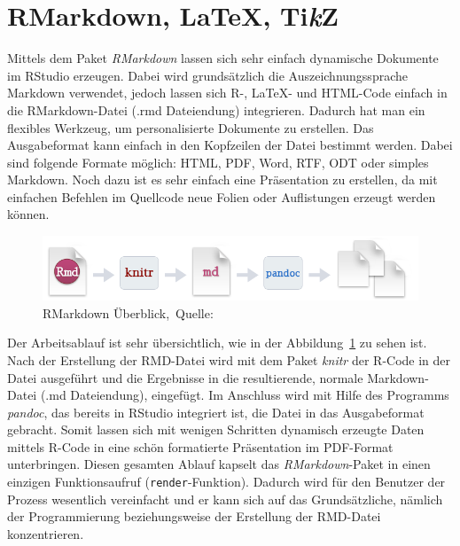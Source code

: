 \section{RMarkdown, \LaTeX, Ti\textit{k}Z}
\label{sec:RMarkdown}
Mittels dem Paket \emph{RMarkdown} lassen sich sehr einfach dynamische Dokumente im RStudio erzeugen. Dabei wird grundsätzlich die Auszeichnungssprache Markdown verwendet, jedoch lassen sich R-, \LaTeX - und HTML-Code einfach in die RMarkdown-Datei (.rmd Dateiendung) integrieren. Dadurch hat man ein flexibles Werkzeug, um personalisierte Dokumente zu erstellen. Das Ausgabeformat kann einfach in den Kopfzeilen der Datei bestimmt werden. Dabei sind folgende Formate möglich: HTML, PDF, Word, RTF, ODT oder simples Markdown. Noch dazu ist es sehr einfach eine Präsentation zu erstellen, da mit einfachen Befehlen im Quellcode neue Folien oder Auflistungen erzeugt werden können.

\begin{figure}[th]
\centering
\includegraphics[width=\ScaleIfNeeded]{pictures/RMarkdown}
\caption{RMarkdown Überblick,~Quelle:~\cite{rmarkdown}}
\label{pic:RMarkdown}
\end{figure}

Der Arbeitsablauf ist sehr übersichtlich, wie in der Abbildung~\ref{pic:RMarkdown} zu sehen ist. Nach der Erstellung der RMD-Datei wird mit dem Paket \emph{knitr} der R-Code in der Datei ausgeführt und die Ergebnisse in die resultierende, normale Markdown-Datei (.md Dateiendung), eingefügt. Im Anschluss wird mit Hilfe des Programms \emph{pandoc}, das bereits in RStudio integriert ist, die Datei in das Ausgabeformat gebracht. Somit lassen sich mit wenigen Schritten dynamisch erzeugte Daten mittels R-Code in eine schön formatierte Präsentation im PDF-Format unterbringen. Diesen gesamten Ablauf kapselt das \emph{RMarkdown}-Paket in einen einzigen Funktionsaufruf (\texttt{render}-Funktion). Dadurch wird für den Benutzer der Prozess wesentlich vereinfacht und er kann sich auf das Grundsätzliche, nämlich der Programmierung beziehungsweise der Erstellung der RMD-Datei konzentrieren.~\cite{rmarkdown}

